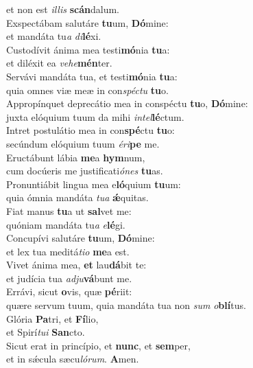 \oddverse et non est \textit{il}\textit{lis} \textbf{scán}dalum.\\
\evenverse Exspectábam salutáre \textbf{tu}um, \textbf{Dó}mine:~\*\\
\evenverse et mandáta tu\textit{a} \textit{di}\textbf{lé}xi.\\
\oddverse Custodívit ánima mea testi\textbf{mó}nia \textbf{tu}a:~\*\\
\oddverse et diléxit ea \textit{ve}\textit{he}\textbf{mén}ter.\\
\evenverse Servávi mandáta tua, et testi\textbf{mó}nia \textbf{tu}a:~\*\\
\evenverse quia omnes viæ meæ in con\textit{spé}\textit{ctu} \textbf{tu}o.\\
\oddverse Appropínquet deprecátio mea in conspéctu \textbf{tu}o, \textbf{Dó}mine:~\*\\
\oddverse juxta elóquium tuum da mihi \textit{in}\textit{tel}\textbf{lé}ctum.\\
\evenverse Intret postulátio mea in con\textbf{spé}ctu \textbf{tu}o:~\*\\
\evenverse secúndum elóquium tuum \textit{é}\textit{ri}\textbf{pe} me.\\
\oddverse Eructábunt lábia \textbf{me}a \textbf{hym}num,~\*\\
\oddverse cum docúeris me justificati\textit{ó}\textit{nes} \textbf{tu}as.\\
\evenverse Pronuntiábit lingua mea e\textbf{ló}quium \textbf{tu}um:~\*\\
\evenverse quia ómnia mandáta \textit{tu}\textit{a} \textbf{ǽ}quitas.\\
\oddverse Fiat manus \textbf{tu}a ut \textbf{sal}vet me:~\*\\
\oddverse quóniam mandáta tu\textit{a} \textit{e}\textbf{lé}gi.\\
\evenverse Concupívi salutáre \textbf{tu}um, \textbf{Dó}mine:~\*\\
\evenverse et lex tua meditá\textit{ti}\textit{o} \textbf{me}a est.\\
\oddverse Vivet ánima mea, \textbf{et} lau\textbf{dá}bit te:~\*\\
\oddverse et judícia tua \textit{ad}\textit{ju}\textbf{vá}bunt me.\\
\evenverse Errávi, sicut \textbf{o}vis, quæ \textbf{pé}riit:~\*\\
\evenverse quære servum tuum, quia mandáta tua non \textit{sum} \textit{o}\textbf{blí}tus.\\
\oddverse Glória \textbf{Pa}tri, et \textbf{Fí}lio,~\*\\
\oddverse et Spirí\textit{tu}\textit{i} \textbf{San}cto.\\
\evenverse Sicut erat in princípio, et \textbf{nunc}, et \textbf{sem}per,~\*\\
\evenverse et in sǽcula sæcu\textit{ló}\textit{rum}. \textbf{A}men.\\
